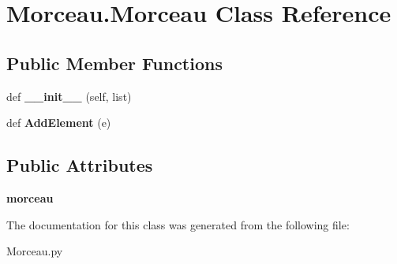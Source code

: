 \hypertarget{class_morceau_1_1_morceau}{}\section{Morceau.\+Morceau Class Reference}
\label{class_morceau_1_1_morceau}
\subsection*{Public Member Functions}
\begin{DoxyCompactItemize}
\item 
\mbox{\label{class_morceau_1_1_morceau_afc3dc4fd6e69a1c821ec95562bb9488a}} 
def {\bfseries \+\_\+\+\_\+init\+\_\+\+\_\+} (self, list)
\item 
\mbox{\label{class_morceau_1_1_morceau_a2a988f7e31ee806f9842875761f7788a}} 
def {\bfseries Add\+Element} (e)
\end{DoxyCompactItemize}
\subsection*{Public Attributes}
\begin{DoxyCompactItemize}
\item 
\mbox{\label{class_morceau_1_1_morceau_a7af095622a22af052e4bc00cb7d4343d}} 
{\bfseries morceau}
\end{DoxyCompactItemize}


The documentation for this class was generated from the following file\+:\begin{DoxyCompactItemize}
\item 
Morceau.\+py\end{DoxyCompactItemize}
